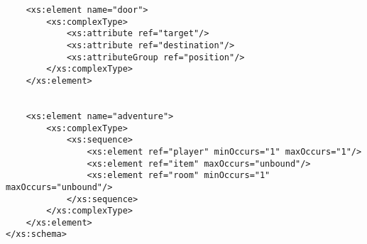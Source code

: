 \begin{lstlisting}
    <xs:element name="door">
        <xs:complexType>
            <xs:attribute ref="target"/>
            <xs:attribute ref="destination"/>
            <xs:attributeGroup ref="position"/>    
        </xs:complexType>
    </xs:element>


    <xs:element name="adventure">
        <xs:complexType>
            <xs:sequence>
                <xs:element ref="player" minOccurs="1" maxOccurs="1"/>
                <xs:element ref="item" maxOccurs="unbound"/> 
                <xs:element ref="room" minOccurs="1" maxOccurs="unbound"/>
            </xs:sequence>
        </xs:complexType>
    </xs:element>
</xs:schema>

\end{lstlisting}

